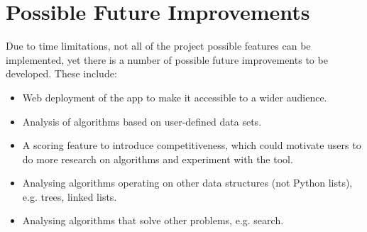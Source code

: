 \documentclass{article}
\begin{document}
    \section{Possible Future Improvements} \label {futureFeatures}
        Due to time limitations, not all of the project possible features can be implemented, yet there is a number of possible future improvements to be developed. These include:
        \begin{itemize}
            \item Web deployment of the app to make it accessible to a wider audience.
            \item Analysis of algorithms based on user-defined data sets.
            \item A scoring feature to introduce competitiveness, which could motivate users to do more research on algorithms and experiment with the tool.
            \item Analysing algorithms operating on other data structures (not Python lists), e.g. trees, linked lists.
            \item Analysing algorithms that solve other problems, e.g. search.
        \end{itemize}

\newpage

    
\nocite{*}
\printbibliography
\end{document}
